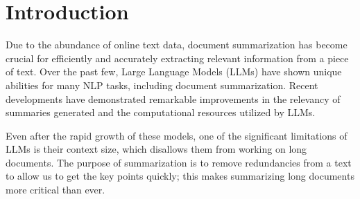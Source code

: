 \section{Introduction}
\label{sec:introduction}

Due to the abundance of online text data, document summarization has become crucial for efficiently and accurately extracting relevant information from a piece of text.
Over the past few, Large Language Models (LLMs) have shown unique abilities for many NLP tasks, including document summarization.
Recent developments have demonstrated remarkable improvements in the relevancy of summaries generated and the computational resources utilized by LLMs.

Even after the rapid growth of these models, one of the significant limitations of LLMs is their context size, which disallows them from working on long documents.
The purpose of summarization is to remove redundancies from a text to allow us to get the key points quickly; this makes summarizing long documents more critical than ever.

